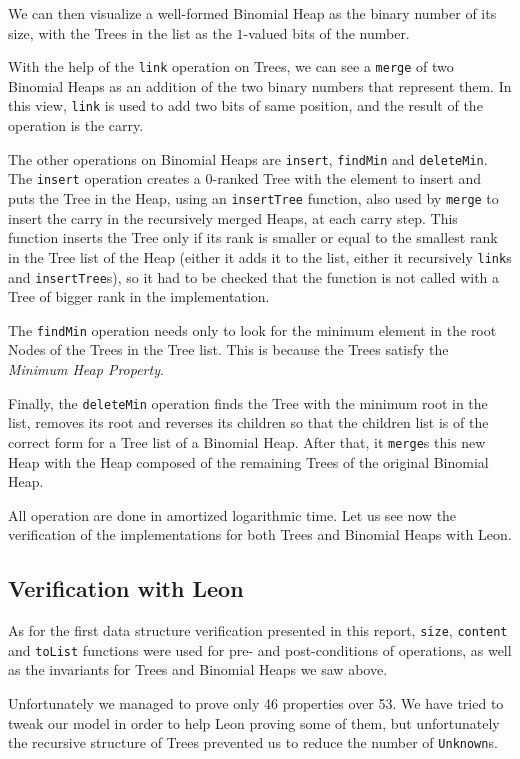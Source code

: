 We can then visualize a well-formed Binomial Heap as the binary number of its size, 
with the Trees in the list as the $1$-valued bits of the number.

With the help of the \verb|link| operation on Trees, 
we can see a \verb|merge| of two Binomial Heaps 
as an addition of the two binary numbers that represent them.
In this view, \verb|link| is used to add two bits of same position,
and the result of the operation is the carry.

The other operations on Binomial Heaps are \verb|insert|, \verb|findMin| and \verb|deleteMin|. 
The \verb|insert| operation creates a $0$-ranked Tree with the element to insert 
and puts the Tree in the Heap, using an \verb|insertTree| function, 
also used by \verb|merge| to insert the carry in the recursively merged Heaps,
at each carry step.
This function inserts the Tree only if its rank is smaller or equal to the smallest rank in the Tree list of the Heap 
(either it adds it to the list, either it recursively \verb|link|s and \verb|insertTree|s),
so it had to be checked that the function is not called with a Tree of bigger rank in the implementation.

The \verb|findMin| operation needs only to look for the minimum element 
in the root Nodes of the Trees in the Tree list.
This is because the Trees satisfy the \emph{Minimum Heap Property}.

Finally, the \verb|deleteMin| operation finds the Tree with the minimum root in the list,
removes its root 
and reverses its children so that the children list is of the correct form for a Tree list of a Binomial Heap.
After that, it \verb|merge|s this new Heap with the Heap composed of 
the remaining Trees of the original Binomial Heap.

All operation are done in amortized logarithmic time.
Let us see now the verification of the implementations 
for both Trees and Binomial Heaps with Leon.

\subsection{Verification with Leon}
As for the first data structure verification presented in this report,
 \verb|size|, \verb|content| and \verb|toList| functions were used
 for pre- and post-conditions of operations,
as well as the invariants for Trees and Binomial Heaps we saw above.

Unfortunately we managed to prove only 46 properties over 53. 
We have tried to tweak our model in order to help Leon proving some of them,
but unfortunately the recursive structure of Trees prevented us to reduce the number of \verb|Unknown|s.

